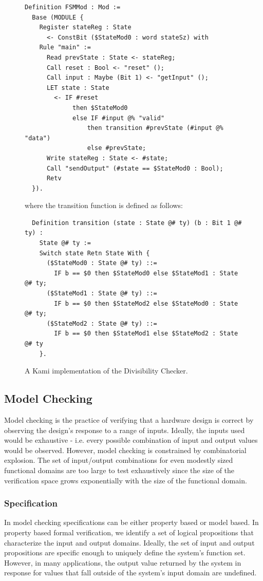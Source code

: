 \documentclass[10pt,a4paper]{article}
\begin{document}
\begin{figure}
\centering
\begin{verbatim}
Definition FSMMod : Mod :=
  Base (MODULE {
    Register stateReg : State
      <- ConstBit ($StateMod0 : word stateSz) with
    Rule "main" :=
      Read prevState : State <- stateReg;
      Call reset : Bool <- "reset" ();
      Call input : Maybe (Bit 1) <- "getInput" ();
      LET state : State
        <- IF #reset
             then $StateMod0
             else IF #input @% "valid"
                 then transition #prevState (#input @% "data")
                 else #prevState;
      Write stateReg : State <- #state;
      Call "sendOutput" (#state == $StateMod0 : Bool);
      Retv
  }).
\end{verbatim}
where the transition function is defined as follows:
\begin{verbatim}
  Definition transition (state : State @# ty) (b : Bit 1 @# ty) :
    State @# ty :=
    Switch state Retn State With {
      ($StateMod0 : State @# ty) ::=
        IF b == $0 then $StateMod0 else $StateMod1 : State @# ty;
      ($StateMod1 : State @# ty) ::=
        IF b == $0 then $StateMod2 else $StateMod0 : State @# ty;
      ($StateMod2 : State @# ty) ::=
        IF b == $0 then $StateMod1 else $StateMod2 : State @# ty
    }.
\end{verbatim}
\caption{A Kami implementation of the Divisibility Checker.}
\label{fsm-kami}
\end{figure}

\subsection{Model Checking}

Model checking is the practice of verifying that a hardware design is correct by observing the design’s response to a range of inputs. Ideally, the inputs used would be exhaustive - i.e. every possible combination of input and output values would be observed. However, model checking is constrained by combinatorial explosion. The set of input/output combinations for even modestly sized functional domains are too large to test exhaustively since the size of the verification space grows exponentially with the size of the functional domain.

\subsubsection{Specification}
In model checking specifications can be either property based or model based. In property based formal verification, we identify a set of logical propositions that characterize the input and output domains. Ideally, the set of input and output propositions are specific enough to uniquely define the system’s function set. However, in many applications, the output value returned by the system in response for values that fall outside of the system’s input domain are undefined.
\end{document}
